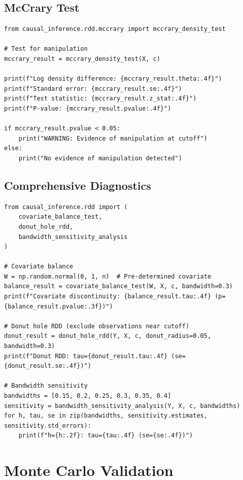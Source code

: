 \subsection{McCrary Test}

\begin{verbatim}
from causal_inference.rdd.mccrary import mccrary_density_test

# Test for manipulation
mccrary_result = mccrary_density_test(X, c)

print(f"Log density difference: {mccrary_result.theta:.4f}")
print(f"Standard error: {mccrary_result.se:.4f}")
print(f"Test statistic: {mccrary_result.z_stat:.4f}")
print(f"P-value: {mccrary_result.pvalue:.4f}")

if mccrary_result.pvalue < 0.05:
    print("WARNING: Evidence of manipulation at cutoff")
else:
    print("No evidence of manipulation detected")
\end{verbatim}

\subsection{Comprehensive Diagnostics}

\begin{verbatim}
from causal_inference.rdd import (
    covariate_balance_test,
    donut_hole_rdd,
    bandwidth_sensitivity_analysis
)

# Covariate balance
W = np.random.normal(0, 1, n)  # Pre-determined covariate
balance_result = covariate_balance_test(W, X, c, bandwidth=0.3)
print(f"Covariate discontinuity: {balance_result.tau:.4f} (p={balance_result.pvalue:.3f})")

# Donut hole RDD (exclude observations near cutoff)
donut_result = donut_hole_rdd(Y, X, c, donut_radius=0.05, bandwidth=0.3)
print(f"Donut RDD: tau={donut_result.tau:.4f} (se={donut_result.se:.4f})")

# Bandwidth sensitivity
bandwidths = [0.15, 0.2, 0.25, 0.3, 0.35, 0.4]
sensitivity = bandwidth_sensitivity_analysis(Y, X, c, bandwidths)
for h, tau, se in zip(bandwidths, sensitivity.estimates, sensitivity.std_errors):
    print(f"h={h:.2f}: tau={tau:.4f} (se={se:.4f})")
\end{verbatim}

\section{Monte Carlo Validation}
\label{sec:rdd_validation}

